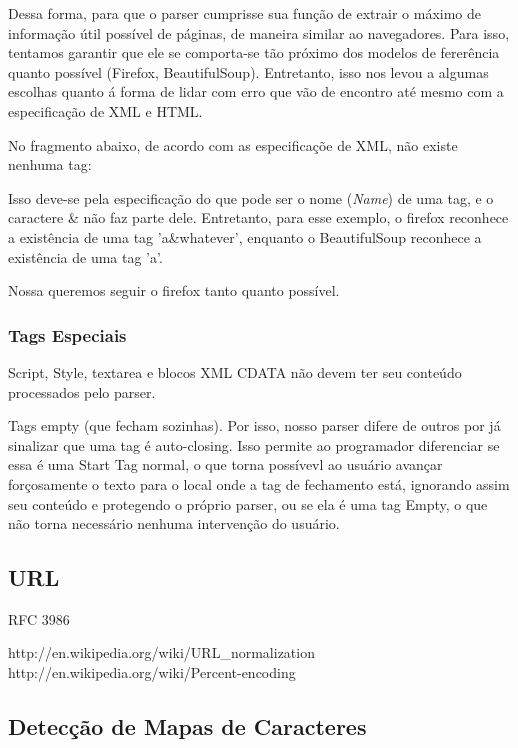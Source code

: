 \documentclass[10pt,twocolumn]{article}
\begin{document}
Dessa forma, para que o parser cumprisse sua função de extrair o máximo de
informação útil possível de páginas, de maneira similar ao navegadores. Para
isso, tentamos garantir que ele se comporta-se tão próximo dos modelos de
fererência quanto possível (Firefox, BeautifulSoup). Entretanto, isso nos levou
a algumas escolhas quanto á forma de lidar com erro que vão de encontro até
mesmo com a especificação de XML e HTML.

No fragmento abaixo, de acordo com as especificaçõe de XML, não existe nenhuma tag:

Isso deve-se pela especificação do que pode ser o nome (\emph{Name}) de uma
tag, e o caractere \& não faz parte dele. Entretanto, para esse exemplo, o
firefox reconhece a existência de uma tag 'a\&whatever', enquanto o
BeautifulSoup reconhece a existência de uma tag 'a'.

Nossa queremos seguir o firefox tanto quanto possível.

\subsubsection{Tags Especiais}

Script, Style, textarea e blocos XML CDATA não devem ter seu conteúdo
processados pelo parser.

Tags empty (que fecham sozinhas). Por isso, nosso parser difere de outros por
já sinalizar que uma tag é auto-closing. Isso permite ao programador
diferenciar se essa é uma Start Tag normal, o que torna possívevl ao usuário
avançar forçosamente o texto para o local onde a tag de fechamento está,
ignorando assim seu conteúdo e protegendo o próprio parser, ou se ela é uma tag
Empty, o que não torna necessário nenhuma intervenção do usuário.

\subsection{URL}

RFC 3986

http://en.wikipedia.org/wiki/URL\_normalization
http://en.wikipedia.org/wiki/Percent-encoding




\subsection{Detecção de Mapas de Caracteres}
\end{document}
